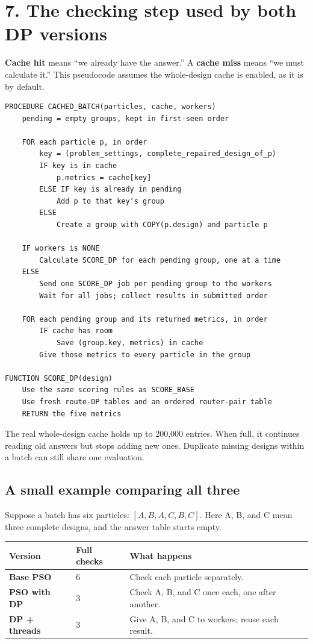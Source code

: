 \documentclass[11pt,a4paper]{article}
\begin{document}
\clearpage
\section*{7. The checking step used by both DP versions}
\label{page:batch}
\textbf{Cache hit} means ``we already have the answer.'' A \textbf{cache miss}
means ``we must calculate it.'' This pseudocode assumes the whole-design
cache is enabled, as it is by default.

\begin{lstlisting}
PROCEDURE CACHED_BATCH(particles, cache, workers)
    pending = empty groups, kept in first-seen order

    FOR each particle p, in order
        key = (problem_settings, complete_repaired_design_of_p)
        IF key is in cache
            p.metrics = cache[key]
        ELSE IF key is already in pending
            Add p to that key's group
        ELSE
            Create a group with COPY(p.design) and particle p

    IF workers is NONE
        Calculate SCORE_DP for each pending group, one at a time
    ELSE
        Send one SCORE_DP job per pending group to the workers
        Wait for all jobs; collect results in submitted order

    FOR each pending group and its returned metrics, in order
        IF cache has room
            Save (group.key, metrics) in cache
        Give those metrics to every particle in the group

FUNCTION SCORE_DP(design)
    Use the same scoring rules as SCORE_BASE
    Use fresh route-DP tables and an ordered router-pair table
    RETURN the five metrics
\end{lstlisting}

The real whole-design cache holds up to 200,000 entries. When full, it
continues reading old answers but stops adding new ones. Duplicate missing
designs within a batch can still share one evaluation.

\subsection*{A small example comparing all three}
Suppose a batch has six particles: $[A,B,A,C,B,C]$. Here A, B, and C mean
three complete designs, and the answer table starts empty.

\begin{tabularx}{\linewidth}{@{}>{\bfseries}p{30mm}p{24mm}X@{}}
Version & Full checks & What happens \\
\hline
Base PSO & 6 & Check each particle separately. \\
PSO with DP & 3 & Check A, B, and C once each, one after another. \\
DP + threads & 3 & Give A, B, and C to workers; reuse each result. \\
\end{tabularx}
\end{document}
